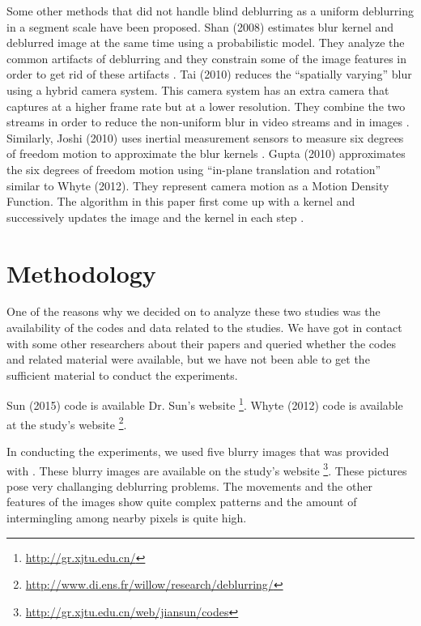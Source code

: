 \documentclass[10pt,twocolumn,letterpaper]{article}
\begin{document}
Some other methods that did not handle blind deblurring as a uniform deblurring in a segment scale have been proposed. Shan \etal (2008) estimates blur kernel and deblurred image at the same time using a probabilistic model. They analyze the common artifacts of deblurring and they constrain some of the image features in order to get rid of these artifacts \cite{shan2008high}. Tai \etal (2010) reduces the ``spatially varying'' blur using a hybrid camera system. This camera system has an extra camera that captures at a higher frame rate but at a lower resolution. They combine the two streams in order to reduce the non-uniform blur in video streams and in images \cite{tai2010correction}. Similarly, Joshi \etal (2010) uses inertial measurement sensors to measure six degrees of freedom motion to approximate the blur kernels \cite{joshi2010image}. Gupta \etal (2010) approximates the six degrees of freedom motion using ``in-plane translation and rotation'' similar to Whyte \etal (2012). They represent camera motion as a Motion Density Function. The algorithm in this paper first come up with a kernel and successively updates the image and the kernel in each step \cite{gupta2010single}.



 

\section{Methodology}

One of the reasons why we decided on to analyze these two studies was the availability of the codes and data related to the studies. We have got in contact with some other researchers about their papers and queried whether the codes and related material were available, but we have not been able to get the sufficient material to conduct the experiments.

Sun \etal (2015) code is available Dr. Sun's website \footnote{\url{http://gr.xjtu.edu.cn/}}. Whyte \etal (2012) code is available at the study's website \footnote{\url{http://www.di.ens.fr/willow/research/deblurring/}}.

In conducting the experiments, we used five blurry images that was provided with \cite{whyte2012non}. These blurry images are available on the study's website \footnote{\url{http://gr.xjtu.edu.cn/web/jiansun/codes}}. These pictures pose very challanging deblurring problems. The movements and the other features of the images show quite complex patterns and the amount of intermingling among nearby pixels is quite high.
\end{document}
